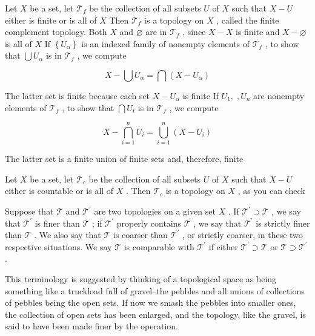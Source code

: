 \begin{example} Let \(X\) be a set, let \({\mathcal{T}}_{f}\) be the collection of all subsets \(U\) of \(X\) such that \(X - U\) either is finite or is all of \(X\) Then \({\mathcal{T}}_{f}\) is a topology on \(X\) , called the finite complement topology. Both \(X\) and \(\varnothing\) are in \({\mathcal{T}}_{f}\) , since \(X - X\) is finite and \(X - \varnothing\) is all of \(X\) If \(\left\{  {U}_{\alpha }\right\}\) is an indexed family of nonempty elements of \({\mathcal{T}}_{f}\) , to show that \(\bigcup {U}_{\alpha }\) is in \({\mathcal{T}}_{f}\) , we compute

\[
X - \bigcup {U}_{\alpha } = \bigcap \left( {X - {U}_{\alpha }}\right)
\]

The latter set is finite because each set \(X - {U}_{\alpha }\) is finite If \({U}_{1},\;,{U}_{n}\) are nonempty elements of \({\mathcal{T}}_{f}\) , to show that \(\bigcap {U}_{t}\) is in \({\mathcal{T}}_{f}\) , we compute

\[
X - \mathop{\bigcap }\limits_{{i = 1}}^{n}{U}_{i} = \mathop{\bigcup }\limits_{{i = 1}}^{n}\left( {X - {U}_{i}}\right)
\]

The latter set is a finite union of finite sets and, therefore, finite
\end{example}

\begin{example} Let \(X\) be a set, let \({\mathcal{T}}_{c}\) be the collection of all subsets \(U\) of \(X\) such that \(X - U\) either is countable or is all of \(X\) . Then \({\mathcal{T}}_{c}\) is a topology on \(X\) , as you can check
\end{example}

\begin{definition} Suppose that \(\mathcal{T}\) and \({\mathcal{T}}^{\prime }\) are two topologies on a given set \(X\) . If \({\mathcal{T}}^{\prime } \supset  \mathcal{T}\) , we say that \({\mathcal{T}}^{\prime }\) is finer than \(\mathcal{T}\) ; if \({\mathcal{T}}^{\prime }\) properly contains \(\mathcal{T}\) , we say that \({\mathcal{T}}^{\prime }\) is strictly finer than \(\mathcal{T}\) . We also say that \(\mathcal{T}\) is coarser than \({\mathcal{T}}^{\prime }\) , or strictly coarser, in these two respective situations. We say \(\mathcal{T}\) is comparable with \({\mathcal{T}}^{\prime }\) if either \({\mathcal{T}}^{\prime } \supset  \mathcal{T}\) or \(\mathcal{T} \supset  {\mathcal{T}}^{\prime }\) .
\end{definition}


This terminology is suggested by thinking of a topological space as being something like a truckload full of gravel--the pebbles and all unions of collections of pebbles being the open sets. If now we smash the pebbles into smaller ones, the collection of open sets has been enlarged, and the topology, like the gravel, is said to have been made finer by the operation.

